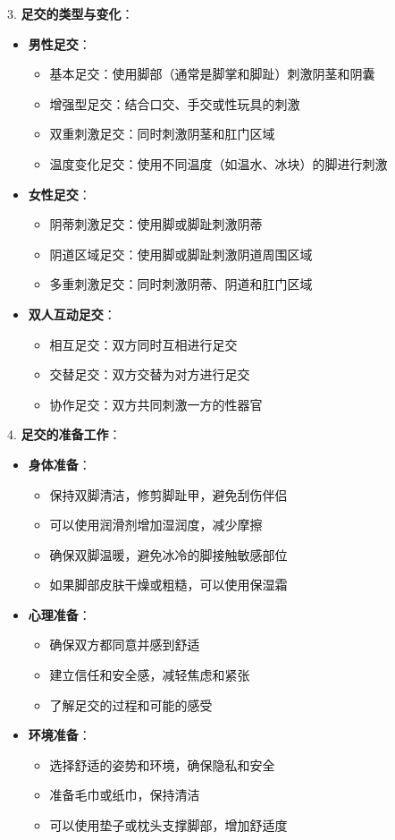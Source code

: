 \documentclass[12pt,UTF8]{ctexbook}
\begin{document}
3. \textbf{足交的类型与变化}：
\begin{itemize}
	\item \textbf{男性足交}：
	\begin{itemize}
		\item 基本足交：使用脚部（通常是脚掌和脚趾）刺激阴茎和阴囊
		\item 增强型足交：结合口交、手交或性玩具的刺激
		\item 双重刺激足交：同时刺激阴茎和肛门区域
		\item 温度变化足交：使用不同温度（如温水、冰块）的脚进行刺激
	\end{itemize}
	\item \textbf{女性足交}：
	\begin{itemize}
		\item 阴蒂刺激足交：使用脚或脚趾刺激阴蒂
		\item 阴道区域足交：使用脚或脚趾刺激阴道周围区域
		\item 多重刺激足交：同时刺激阴蒂、阴道和肛门区域
	\end{itemize}
	\item \textbf{双人互动足交}：
	\begin{itemize}
		\item 相互足交：双方同时互相进行足交
		\item 交替足交：双方交替为对方进行足交
		\item 协作足交：双方共同刺激一方的性器官
	\end{itemize}
\end{itemize}

4. \textbf{足交的准备工作}：
\begin{itemize}
	\item \textbf{身体准备}：
	\begin{itemize}
		\item 保持双脚清洁，修剪脚趾甲，避免刮伤伴侣
		\item 可以使用润滑剂增加湿润度，减少摩擦
		\item 确保双脚温暖，避免冰冷的脚接触敏感部位
		\item 如果脚部皮肤干燥或粗糙，可以使用保湿霜
	\end{itemize}
	\item \textbf{心理准备}：
	\begin{itemize}
		\item 确保双方都同意并感到舒适
		\item 建立信任和安全感，减轻焦虑和紧张
		\item 了解足交的过程和可能的感受
	\end{itemize}
	\item \textbf{环境准备}：
	\begin{itemize}
		\item 选择舒适的姿势和环境，确保隐私和安全
		\item 准备毛巾或纸巾，保持清洁
		\item 可以使用垫子或枕头支撑脚部，增加舒适度
	\end{itemize}
\end{itemize}
\end{document}
